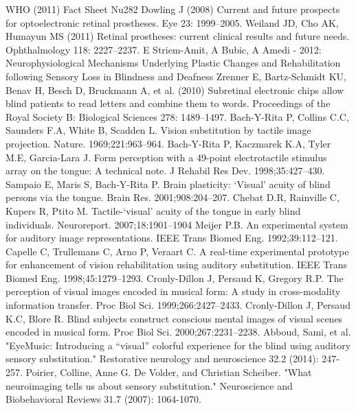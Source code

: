 \documentclass{article}
\numberwithin{figure}{section}
\begin{document}
\begin{thebibliography}{9}

  WHO (2011) Fact Sheet Nu282
Dowling J (2008) Current and future prospects for optoelectronic retinal prostheses. Eye 23: 1999–2005.
Weiland JD, Cho AK, Humayun MS (2011) Retinal prostheses: current clinical results and future needs. Ophthalmology 118: 2227–2237.
E Striem-Amit, A Bubic, A Amedi - 2012: Neurophysiological Mechanisms Underlying Plastic Changes and Rehabilitation following Sensory Loss in Blindness and Deafness
Zrenner E, Bartz-Schmidt KU, Benav H, Besch D, Bruckmann A, et al. (2010) Subretinal electronic chips allow blind patients to read letters and combine them to words. Proceedings of the Royal Society B: Biological Sciences 278: 1489–1497.
Bach-Y-Rita P, Collins C.C, Saunders F.A, White B, Scadden L. Vision substitution by tactile image projection. Nature. 1969;221:963–964. 
Bach-Y-Rita P, Kaczmarek K.A, Tyler M.E, Garcia-Lara J. Form perception with a 49-point electrotactile stimulus array on the tongue: A technical note. J Rehabil Res Dev. 1998;35:427–430.
Sampaio E, Maris S, Bach-Y-Rita P. Brain plasticity: ‘Visual’ acuity of blind persons via the tongue. Brain Res. 2001;908:204–207. 
Chebat D.R, Rainville C, Kupers R, Ptito M. Tactile-‘visual’ acuity of the tongue in early blind individuals. Neuroreport. 2007;18:1901–1904
Meijer P.B. An experimental system for auditory image representations. IEEE Trans Biomed Eng. 1992;39:112–121.
Capelle C, Trullemans C, Arno P, Veraart C. A real-time experimental prototype for enhancement of vision rehabilitation using auditory substitution. IEEE Trans Biomed Eng. 1998;45:1279–1293. 
Cronly-Dillon J, Persaud K, Gregory R.P. The perception of visual images encoded in musical form: A study in cross-modality information transfer. Proc Biol Sci. 1999;266:2427–2433. 
Cronly-Dillon J, Persaud K.C, Blore R. Blind subjects construct conscious mental images of visual scenes encoded in musical form. Proc Biol Sci. 2000;267:2231–2238.
Abboud, Sami, et al. "EyeMusic: Introducing a “visual” colorful experience for the blind using auditory sensory substitution." Restorative neurology and neuroscience 32.2 (2014): 247-257.
Poirier, Colline, Anne G. De Volder, and Christian Scheiber. "What neuroimaging tells us about sensory substitution." Neuroscience and Biobehavioral Reviews 31.7 (2007): 1064-1070.

\end{thebibliography}
\end{document}
